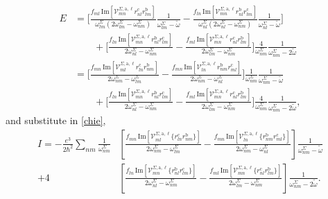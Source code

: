 \documentclass[letterpaper,aps]{revtex4}
\begin{document}
\begin{align*}
E &=  
\Bigg[
  \frac{f_{ml}\,\mathrm{Im}\left[\mathcal{V}^{\Sigma,\text{a},\ell}_{mn}
        r^{\text{c}}_{nl}
        r^{\text{b}}_{lm}\right]}
        {\omega^\Sigma_{lm}(2\omega^\Sigma_{lm}-\omega^\Sigma_{nm})}
\frac{1}{\omega^\Sigma_{lm}-\tilde\omega}
 -\frac{f_{ln}\,\mathrm{Im}\left[\mathcal{V}^{\Sigma,\text{a},\ell}_{mn}
        r^{\text{b}}_{nl}
        r^{\text{c}}_{lm}\right]}
        {\omega^\Sigma_{nl}(2\omega^\Sigma_{nl}-\omega^\Sigma_{nm})}
\frac{1}{\omega^\Sigma_{nl}-\tilde\omega}
\Bigg]\nonumber\\
&\qquad+
\Bigg[
  \frac{f_{ln}\,\mathrm{Im}\left[\mathcal{V}^{\Sigma,\text{a},\ell}_{mn}
        r^{\text{b}}_{nl}
        r^{\text{c}}_{lm}\right]}
        {2\omega^\Sigma_{nl}-\omega^\Sigma_{nm}}
 -\frac{f_{ml}\,\mathrm{Im}\left[\mathcal{V}^{\Sigma,\text{a},\ell}_{mn}
        r^{\text{c}}_{nl}
        r^{\text{b}}_{lm}\right]}
        {2\omega^\Sigma_{lm}-\omega^\Sigma_{nm}}
\Bigg]\frac{4}{\omega^\Sigma_{nm}}\frac{1}{\omega^\Sigma_{nm}-2\tilde\omega}\nonumber\\
&=  
\Bigg[
  \frac{f_{mn}\,\mathrm{Im}\left[\mathcal{V}^{\Sigma,\text{a},\ell}_{ml}
        r^{\text{c}}_{ln}
        r^{\text{b}}_{nm}\right]}
        {2\omega^\Sigma_{nm}-\omega^\Sigma_{lm}}
 -\frac{f_{mn}\,\mathrm{Im}\left[\mathcal{V}^{\Sigma,\text{a},\ell}_{ln}
        r^{\text{b}}_{nm}
        r^{\text{c}}_{ml}\right]}
        {2\omega^\Sigma_{nm}-\omega^\Sigma_{nl}}
\Bigg]\frac{1}{\omega^\Sigma_{nm}}\frac{1}{\omega^\Sigma_{nm}-\tilde\omega}\nonumber\\
&\qquad+
\Bigg[
  \frac{f_{ln}\,\mathrm{Im}\left[\mathcal{V}^{\Sigma,\text{a},\ell}_{mn}
        r^{\text{b}}_{nl}
        r^{\text{c}}_{lm}\right]}
        {2\omega^\Sigma_{nl}-\omega^\Sigma_{nm}}
 -\frac{f_{ml}\,\mathrm{Im}\left[\mathcal{V}^{\Sigma,\text{a},\ell}_{mn}
        r^{\text{c}}_{nl}
        r^{\text{b}}_{lm}\right]}
        {2\omega^\Sigma_{lm}-\omega^\Sigma_{nm}}
\Bigg]\frac{4}{\omega^\Sigma_{nm}}\frac{1}{\omega^\Sigma_{nm}-2\tilde\omega}
,
\end{align*}
and substitute in \eqref{chie},
\begin{align*}
I = -\frac{e^3}{2\hbar^2}\sum_{nm}\frac{1}{\omega^\Sigma_{nm}}
&\left[
  \frac{f_{mn}\,\mathrm{Im}\left[\mathcal{V}^{\Sigma,\text{a},\ell}_{ml}
        \{r^{\text{c}}_{ln}
        r^{\text{b}}_{nm}\}\right]}
        {2\omega^\Sigma_{nm}-\omega^\Sigma_{lm}}
 -\frac{f_{mn}\,\mathrm{Im}\left[\mathcal{V}^{\Sigma,\text{a},\ell}_{ln}
        \{r^{\text{b}}_{nm}
        r^{\text{c}}_{ml}\}\right]}
        {2\omega^\Sigma_{nm}-\omega^\Sigma_{nl}}
\right]\frac{1}{\omega^\Sigma_{nm}-\tilde\omega}\nonumber\\
+
4&\left[
  \frac{f_{ln}\,\mathrm{Im}\left[\mathcal{V}^{\Sigma,\text{a},\ell}_{mn}
        \{r^{\text{b}}_{nl}
        r^{\text{c}}_{lm}\}\right]}
        {2\omega^\Sigma_{nl}-\omega^\Sigma_{nm}}
 -\frac{f_{ml}\,\mathrm{Im}\left[\mathcal{V}^{\Sigma,\text{a},\ell}_{mn}
        \{r^{\text{c}}_{nl}
        r^{\text{b}}_{lm}\}\right]}
        {2\omega^\Sigma_{lm}-\omega^\Sigma_{nm}}
\right]\frac{1}{\omega^\Sigma_{nm}-2\tilde\omega}
.
\end{align*}
\end{document}
